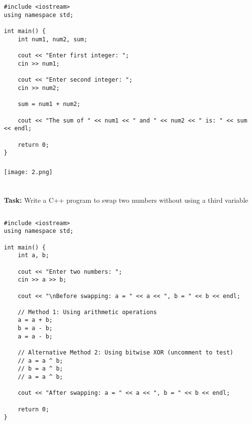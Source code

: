 \documentclass[12pt,a4paper]{article}
\begin{document}
\subsection{}
\begin{lstlisting}
#include <iostream>
using namespace std;

int main() {
    int num1, num2, sum;

    cout << "Enter first integer: ";
    cin >> num1;

    cout << "Enter second integer: ";
    cin >> num2;

    sum = num1 + num2;

    cout << "The sum of " << num1 << " and " << num2 << " is: " << sum << endl;

    return 0;
}
\end{lstlisting}

\subsubsection{}
\begin{center}
    \texttt{[image: 2.png]}
\end{center}


\section{}
\textbf{Task:} Write a C++ program to swap two numbers without using a third variable

\subsection{}
\begin{lstlisting}
#include <iostream>
using namespace std;

int main() {
    int a, b;

    cout << "Enter two numbers: ";
    cin >> a >> b;

    cout << "\nBefore swapping: a = " << a << ", b = " << b << endl;

    // Method 1: Using arithmetic operations
    a = a + b;
    b = a - b;
    a = a - b;

    // Alternative Method 2: Using bitwise XOR (uncomment to test)
    // a = a ^ b;
    // b = a ^ b;
    // a = a ^ b;

    cout << "After swapping: a = " << a << ", b = " << b << endl;

    return 0;
}

\end{lstlisting}
\end{document}
